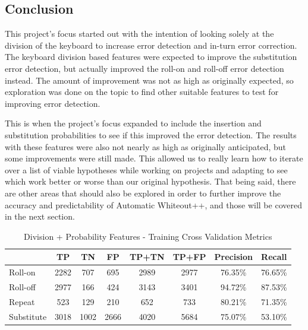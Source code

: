 \documentclass[letterpaper, 10 pt, conference]{ieeeconf}  %
\begin{document}
\subsection{Conclusion}
This project's focus started out with the intention of looking solely at the division of the keyboard to increase error detection and in-turn error correction.  The keyboard division based features were expected to improve the substitution error detection, but actually improved the roll-on and roll-off error detection instead.  The amount of improvement was not as high as originally expected, so exploration was done on the topic to find other suitable features to test for improving error detection.

This is when the project's focus expanded to include the insertion and substitution probabilities to see if this improved the error detection.  The results with these features were also not nearly as high as originally anticipated, but some improvements were still made.  This allowed us to really learn how to iterate over a list of viable hypotheses while working on projects and adapting to see which work better or worse than our original hypothesis.  That being said, there are other areas that should also be explored in order to further improve the accuracy and predictability of Automatic Whiteout++, and those will be covered in the next section.

\begin{table}[h]
\begin{center}
\begin{tabular}{|l|c|c|c|c|c|c|c|} \hline
& TP & TN & FP & TP+TN & TP+FP & Precision & Recall \\ \hline
Roll-on & 2282 & 707 & 695 & 2989 & 2977 & 76.35\% & 76.65\% \\ \hline
Roll-off & 2977 & 166 & 424 & 3143 & 3401 & 94.72\% & 87.53\% \\ \hline
Repeat & 523 & 129 & 210 & 652 & 733 & 80.21\% & 71.35\% \\ \hline
Substitute & 3018 & 1002 & 2666 & 4020 & 5684 & 75.07\% & 53.10\% \\ \hline
\end{tabular}
\caption{Division + Probability Features - Training Cross Validation Metrics}
\label{table:allcvm}
\end{center}
\end{table}
\end{document}

